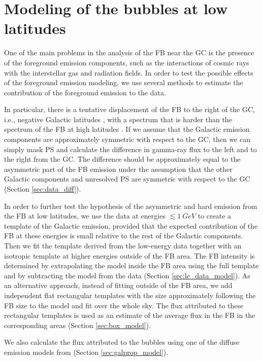 
\section{Modeling of the \Fermi bubbles at low latitudes}
\label{sec:Modeling}
One of the main problems in the analysis of the FB near the GC is the 
presence of the foreground emission components, 
such as the interactions of cosmic rays with the interstellar gas and radiation fields.
In order to test the possible effects of the foreground emission modeling,
we use several methods to estimate the contribution of the foreground emission to the data.

In particular, there is a tentative
displacement of the FB to the right of the GC, i.e., negative Galactic latitudes \citep{2016ApJS..223...26A, 2017ApJ...840...43A},
with a spectrum that is harder than the spectrum of the FB at high latitudes \citep{2017ApJ...840...43A}.
If we assume that the Galactic emission components are approximately symmetric with respect to the GC,
then we can simply mask PS and calculate the difference in gamma-ray flux to the left and to the right from the GC.
The difference should be approximately equal to the asymmetric part of the FB emission
under the assumption that the other Galactic components and unresolved PS are symmetric with respect to the GC
(Section \ref{sec:data_diff}).

In order to further test the hypothesis of the asymmetric and hard emission from the FB at low latitudes,
we use the data at energies $\lesssim \SI{1}{GeV}$ to create a template of the Galactic emission,
provided that the expected contribution of the FB at these energies is small relative to the rest of the Galactic components.
Then we fit the template derived from the low-energy data together with an isotropic template at higher energies
outside of the FB area.
The FB intensity is determined by extrapolating the model inside the FB area using the full template and by subtracting the model
from the data (Section \ref{sec:le_data_model}).
As an alternative approach, instead of fitting outside of the FB area, we add independent flat rectangular templates with the size
approximately following the FB size to the model and fit over the whole sky.
The flux attributed to these rectangular templates is used as an estimate of the average flux in the FB in the corresponding areas
(Section \ref{sec:box_model}).

We also calculate the flux attributed to the bubbles using one of the diffuse emission models from \citep{2017ApJ...840...43A}
(Section \ref{sec:galprop_model}).




